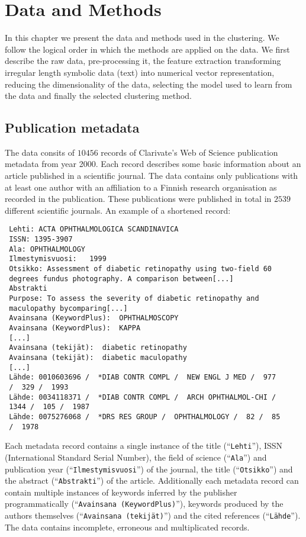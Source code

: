 \chapter{Data and Methods}
\label{chapter:methods}
In this chapter we present the data and methods used in the 
clustering. We follow the logical order in which the methods are 
applied on the data. We first describe the raw data, 
pre-processing it, the feature extraction transforming irregular
length symbolic data (text) into numerical vector representation,
reducing the dimensionality of the data, selecting the model used 
to learn from the data and finally the selected clustering method.

\section{Publication metadata}
\label{section:metadata}
The data consits of $10456$ records of Clarivate's Web of Science 
publication metadata from year 2000. Each record describes some 
basic information about an article published in a scientific 
journal. The data contains only publications with at least one
author with an affiliation to a Finnish research organisation as
recorded in the publication. These publications were published in 
total in $2539$ different scientific journals.
An example of a shortened record:
\begin{verbatim}
 Lehti: ACTA OPHTHALMOLOGICA SCANDINAVICA
 ISSN: 1395-3907
 Ala: OPHTHALMOLOGY
 Ilmestymisvuosi:   1999
 Otsikko: Assessment of diabetic retinopathy using two-field 60 
 degrees fundus photography. A comparison between[...]
 Abstrakti
 Purpose: To assess the severity of diabetic retinopathy and 
 maculopathy bycomparing[...]
 Avainsana (KeywordPlus):  OPHTHALMOSCOPY
 Avainsana (KeywordPlus):  KAPPA
 [...]
 Avainsana (tekijät):  diabetic retinopathy
 Avainsana (tekijät):  diabetic maculopathy
 [...]
 Lähde: 0010603696 /  *DIAB CONTR COMPL /  NEW ENGL J MED /  977 
 /  329 /  1993
 Lähde: 0034118371 /  *DIAB CONTR COMPL /  ARCH OPHTHALMOL-CHI /  
 1344 /  105 /  1987
 Lähde: 0075276068 /  *DRS RES GROUP /  OPHTHALMOLOGY /  82 /  85 
 /  1978
 \end{verbatim}
 
Each metadata record contains a single instance of the title 
(``\texttt{Lehti}''), ISSN (International Standard Serial Number), 
the field of science (``\texttt{Ala}'') and publication year 
(``\texttt{Ilmestymisvuosi}'') of the journal, the title 
(``\texttt{Otsikko}'') and the abstract (``\texttt{Abstrakti}'') 
of the article. Additionally each metadata record can contain
multiple instances of keywords inferred by the publisher programmatically
(``\texttt{Avainsana (KeywordPlus)}''), keywords produced by the 
authors themselves (``\texttt{Avainsana (tekijät)}'') and the 
cited references (``\texttt{Lähde}''). The data contains incomplete,
erroneous and multiplicated records.

